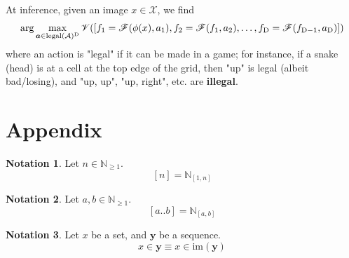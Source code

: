 \documentclass[10pt]{article}
\theoremstyle{definition}
\newtheorem{notation}{Notation}
\theoremstyle{remark}
\newcommand{\N}{\mathbb{N}}
\newcommand{\im}{\mathrm{im}}
\begin{document}

At inference, given an image $x\in\mathcal{X}$, we find
$$
	\arg\max_{\bm{a}\in\operatorname{legal}(\mathcal{A})^{\mathrm{D}}}
	\mathscr{V}\mleft(
		[
			f_{1}=\mathscr{F}(\phi(x), a_{1}),
			f_{2}=\mathscr{F}(f_{1}, a_{2}),
			\dots,
			f_{\mathrm{D}}=\mathscr{F}(f_{\mathrm{D}-1},a_{\mathrm{D}})
		]
	\mright)
$$
where an action is "legal" if it can be made in a game;
for instance, if a snake (head) is at a cell at the top edge of the grid,
then "up" is legal (albeit bad/losing), and "up, up", "up, right", etc. are \textbf{illegal}.


\clearpage

\section{Appendix}

\begin{notation}
Let $n\in\N_{\geq 1}$.
$$
	[n]=\N_{[1,n]}
$$
\end{notation}

\begin{notation}
Let $a,b\in\N_{\geq 1}$.
$$
	[a..b]=\N_{[a,b]}
$$
\end{notation}

\begin{notation}
Let $x$ be a set, and $\bm{y}$ be a sequence.
$$
	x\bm{\in}\bm{y}
	\equiv
	x\in\im(\bm{y})
$$
\end{notation}
\end{document}
